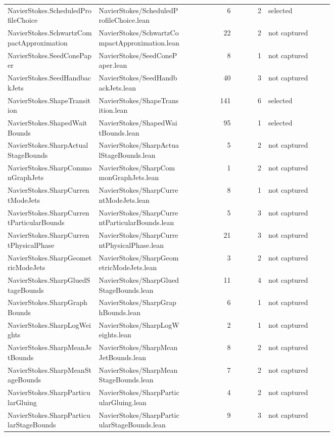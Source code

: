 \documentclass[10pt]{article}
\begin{document}
\begin{longtable}{p{0.28\linewidth}p{0.27\linewidth}r r p{0.20\linewidth}}
NavierStokes.ScheduledProfileChoice & NavierStokes/ScheduledProfileChoice.lean & 6 & 2 & selected\\
NavierStokes.SchwartzCompactApproximation & NavierStokes/SchwartzCompactApproximation.lean & 22 & 2 & not captured\\
NavierStokes.SeedConePaper & NavierStokes/SeedConePaper.lean & 8 & 1 & not captured\\
NavierStokes.SeedHandbackJets & NavierStokes/SeedHandbackJets.lean & 40 & 3 & not captured\\
NavierStokes.ShapeTransition & NavierStokes/ShapeTransition.lean & 141 & 6 & selected\\
NavierStokes.ShapedWaitBounds & NavierStokes/ShapedWaitBounds.lean & 95 & 1 & selected\\
NavierStokes.SharpActualStageBounds & NavierStokes/SharpActualStageBounds.lean & 5 & 2 & not captured\\
NavierStokes.SharpCommonGraphJets & NavierStokes/SharpCommonGraphJets.lean & 1 & 2 & not captured\\
NavierStokes.SharpCurrentModeJets & NavierStokes/SharpCurrentModeJets.lean & 8 & 1 & not captured\\
NavierStokes.SharpCurrentParticularBounds & NavierStokes/SharpCurrentParticularBounds.lean & 5 & 3 & not captured\\
NavierStokes.SharpCurrentPhysicalPhase & NavierStokes/SharpCurrentPhysicalPhase.lean & 21 & 3 & not captured\\
NavierStokes.SharpGeometricModeJets & NavierStokes/SharpGeometricModeJets.lean & 3 & 2 & not captured\\
NavierStokes.SharpGluedStageBounds & NavierStokes/SharpGluedStageBounds.lean & 11 & 4 & not captured\\
NavierStokes.SharpGraphBounds & NavierStokes/SharpGraphBounds.lean & 6 & 1 & not captured\\
NavierStokes.SharpLogWeights & NavierStokes/SharpLogWeights.lean & 2 & 1 & not captured\\
NavierStokes.SharpMeanJetBounds & NavierStokes/SharpMeanJetBounds.lean & 8 & 2 & not captured\\
NavierStokes.SharpMeanStageBounds & NavierStokes/SharpMeanStageBounds.lean & 7 & 2 & not captured\\
NavierStokes.SharpParticularGluing & NavierStokes/SharpParticularGluing.lean & 4 & 2 & not captured\\
NavierStokes.SharpParticularStageBounds & NavierStokes/SharpParticularStageBounds.lean & 9 & 3 & not captured\\

\end{longtable}
\end{document}
